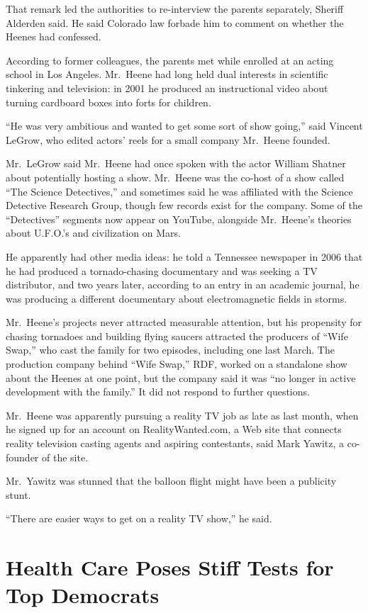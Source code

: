 ﻿\documentclass[12pt]{article}
\begin{document}
That remark led the authorities to re-interview the parents separately, Sheriff Alderden said. He
said Colorado law forbade him to comment on whether the Heenes had confessed.

According to former colleagues, the parents met while enrolled at an acting school in Los Angeles.
Mr.~Heene had long held dual interests in scientific tinkering and television: in 2001 he produced
an instructional video about turning cardboard boxes into forts for children.

``He was very ambitious and wanted to get some sort of show going,'' said Vincent LeGrow, who edited
actors' reels for a small company Mr.~Heene founded.

Mr.~LeGrow said Mr.~Heene had once spoken with the actor William Shatner about potentially hosting a
show. Mr.~Heene was the co-host of a show called ``The Science Detectives,'' and sometimes said he
was affiliated with the Science Detective Research Group, though few records exist for the company.
Some of the ``Detectives'' segments now appear on YouTube, alongside Mr.~Heene's theories about
U.F.O.'s and civilization on Mars.

He apparently had other media ideas: he told a Tennessee newspaper in 2006 that he had produced a
tornado-chasing documentary and was seeking a TV distributor, and two years later, according to an
entry in an academic journal, he was producing a different documentary about electromagnetic fields
in storms.

Mr.~Heene's projects never attracted measurable attention, but his propensity for chasing tornadoes
and building flying saucers attracted the producers of ``Wife Swap,'' who cast the family for two
episodes, including one last March. The production company behind ``Wife Swap,'' RDF, worked on a
standalone show about the Heenes at one point, but the company said it was ``no longer in active
development with the family.'' It did not respond to further questions.

Mr.~Heene was apparently pursuing a reality TV job as late as last month, when he signed up for an
account on RealityWanted.com, a Web site that connects reality television casting agents and
aspiring contestants, said Mark Yawitz, a co-founder of the site.

Mr.~Yawitz was stunned\cite{stun} that the balloon flight might have been a publicity stunt.

``There are easier ways to get on a reality TV show,'' he said.

\section{Health Care Poses Stiff Tests for Top Democrats}
\end{document}
